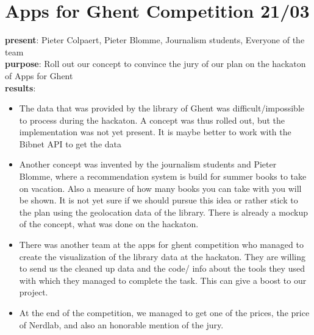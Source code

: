 \section{Apps for Ghent Competition 21/03}
{\bf present}: Pieter Colpaert, Pieter Blomme, Journalism students, Everyone of the team\\
{\bf purpose}: Roll out our concept to convince the jury of our plan on the hackaton of Apps for Ghent\\
{\bf results}: 
\begin{itemize}
  \item The data that was provided by the library of Ghent was difficult/impossible to process during the hackaton. A concept was thus rolled out, but the implementation was not yet present. It is maybe better to work with the Bibnet API to get the data
  \item Another concept was invented by the journalism students and Pieter Blomme, where a recommendation system is build for summer books to take on vacation. Also a measure of how many books you can take with you will be shown. It is not yet sure if we should pursue this idea or rather stick to the plan using the geolocation data of the library. There is already a mockup of the concept, what was done on the hackaton.
  \item There was another team at the apps for ghent competition who managed to create the visualization of the library data at the hackaton. They are willing to send us the cleaned up data and the code/ info about the tools they used with which they managed to complete the task. This can give a boost to our project.
  \item At the end of the competition, we managed to get one of the prices, the price of Nerdlab, and also an honorable mention of the jury.
\end{itemize}